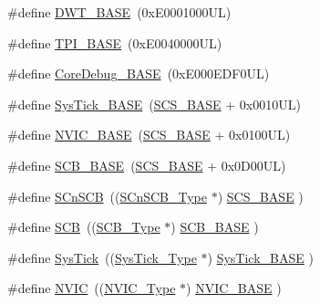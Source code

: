 \begin{DoxyCompactItemize}
\item 
\#define \hyperlink{group___c_m_s_i_s__core__base_gafdab534f961bf8935eb456cb7700dcd2}{D\+W\+T\+\_\+\+B\+A\+SE}~(0x\+E0001000\+U\+L)
\item 
\#define \hyperlink{group___c_m_s_i_s__core__base_ga2b1eeff850a7e418844ca847145a1a68}{T\+P\+I\+\_\+\+B\+A\+SE}~(0x\+E0040000\+U\+L)
\item 
\#define \hyperlink{group___c_m_s_i_s__core__base_ga680604dbcda9e9b31a1639fcffe5230b}{Core\+Debug\+\_\+\+B\+A\+SE}~(0x\+E000\+E\+D\+F0\+U\+L)
\item 
\#define \hyperlink{group___c_m_s_i_s__core__base_ga58effaac0b93006b756d33209e814646}{Sys\+Tick\+\_\+\+B\+A\+SE}~(\hyperlink{group___c_m_s_i_s__core__base_ga3c14ed93192c8d9143322bbf77ebf770}{S\+C\+S\+\_\+\+B\+A\+SE} +  0x0010\+U\+L)
\item 
\#define \hyperlink{group___c_m_s_i_s__core__base_gaa0288691785a5f868238e0468b39523d}{N\+V\+I\+C\+\_\+\+B\+A\+SE}~(\hyperlink{group___c_m_s_i_s__core__base_ga3c14ed93192c8d9143322bbf77ebf770}{S\+C\+S\+\_\+\+B\+A\+SE} +  0x0100\+U\+L)
\item 
\#define \hyperlink{group___c_m_s_i_s__core__base_gad55a7ddb8d4b2398b0c1cfec76c0d9fd}{S\+C\+B\+\_\+\+B\+A\+SE}~(\hyperlink{group___c_m_s_i_s__core__base_ga3c14ed93192c8d9143322bbf77ebf770}{S\+C\+S\+\_\+\+B\+A\+SE} +  0x0\+D00\+U\+L)
\item 
\#define \hyperlink{group___c_m_s_i_s__core__base_ga9fe0cd2eef83a8adad94490d9ecca63f}{S\+Cn\+S\+CB}~((\hyperlink{struct_s_cn_s_c_b___type}{S\+Cn\+S\+C\+B\+\_\+\+Type}    $\ast$)     \hyperlink{group___c_m_s_i_s__core__base_ga3c14ed93192c8d9143322bbf77ebf770}{S\+C\+S\+\_\+\+B\+A\+SE}      )
\item 
\#define \hyperlink{group___c_m_s_i_s__core__base_gaaaf6477c2bde2f00f99e3c2fd1060b01}{S\+CB}~((\hyperlink{struct_s_c_b___type}{S\+C\+B\+\_\+\+Type}       $\ast$)     \hyperlink{group___c_m_s_i_s__core__base_gad55a7ddb8d4b2398b0c1cfec76c0d9fd}{S\+C\+B\+\_\+\+B\+A\+SE}      )
\item 
\#define \hyperlink{group___c_m_s_i_s__core__base_gacd96c53beeaff8f603fcda425eb295de}{Sys\+Tick}~((\hyperlink{struct_sys_tick___type}{Sys\+Tick\+\_\+\+Type}   $\ast$)     \hyperlink{group___c_m_s_i_s__core__base_ga58effaac0b93006b756d33209e814646}{Sys\+Tick\+\_\+\+B\+A\+SE}  )
\item 
\#define \hyperlink{group___c_m_s_i_s__core__base_gac8e97e8ce56ae9f57da1363a937f8a17}{N\+V\+IC}~((\hyperlink{struct_n_v_i_c___type}{N\+V\+I\+C\+\_\+\+Type}      $\ast$)     \hyperlink{group___c_m_s_i_s__core__base_gaa0288691785a5f868238e0468b39523d}{N\+V\+I\+C\+\_\+\+B\+A\+SE}     )

\end{DoxyCompactItemize}
